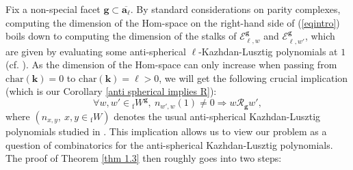 \documentclass[11pt]{amsart}
\theoremstyle{plain}
\theoremstyle{remark}
\numberwithin{equation}{section}
\begin{document}
	 Fix a non-special facet $\mathbf{g}\subset\overline{\mathbf{a}_\ell}$. By standard considerations on parity complexes, computing the dimension of the $\mathrm{Hom}$-space on the right-hand side of (\ref{eqintro}) boils down to computing the dimension of the stalks of $\mathcal{E}_{\ell,w}^{\mathbf{g}}$ and $\mathcal{E}_{\ell,w'}^{\mathbf{g}}$, which are given by evaluating some anti-spherical $\ell$-Kazhdan-Lusztig polynomials at $1$ (cf. \cite[Part III]{riche2018tilting}). As the dimension of the $\mathrm{Hom}$-space can only increase when passing from $\mathrm{char}(\mathbf{k})=0$ to $\mathrm{char}(\mathbf{k})=\ell>0$, we will get the following crucial implication (which is our Corollary \ref{anti spherical implies R}):
	 $$\forall w,w'\in {_\mathrm{f}W}^{\mathbf{g}},~n_{w',w}(1)\neq0\Rightarrow w\mathscr{R}_{\mathbf{g}}w',$$
	 where $(n_{x,y},~x,y\in {_\mathrm{f}W})$ denotes the usual anti-spherical Kazhdan-Lusztig polynomials studied in \cite[Theorem 3.1]{Soergel1997KazhdanLusztigPA}. This implication allows us to view our problem as a question of combinatorics for the anti-spherical Kazhdan-Lusztig polynomials. The proof of Theorem \ref{thm 1.3} then roughly goes into two steps:
\end{document}
